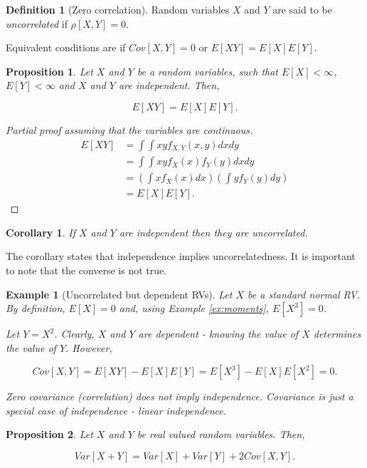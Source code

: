 \documentclass{book}
\theoremstyle{plain}%
\newtheorem{prototheorem}{Example}[section]
\newenvironment{cexample}
   {\colorlet{shadecolor}{gray!10}\begin{shaded}\begin{prototheorem}}
   {\end{prototheorem}\end{shaded}}
\newtheorem{corollary}{Corollary}[section]
\newtheorem{proposition}{Proposition}[section]
\theoremstyle{definition}
\newtheorem{definition}{Definition}[section]
\begin{document}
\begin{definition}[Zero correlation]
Random variables $X$ and $Y$ are said to be \emph{uncorrelated} if $\rho[X,Y] = 0$.

Equivalent conditions are if $Cov[X,Y] = 0$ or $E[XY] = E[X]E[Y]$.
\end{definition}



\begin{proposition}
Let $X$ and $Y$ be a random variables, such that $E[X] < \infty$, $E[Y] < \infty$ and $X$ and $Y$ are independent. Then,

$$E[XY] = E[X]E[Y].$$
\end{proposition}

\begin{proof}[Partial proof assuming that the variables are continuous] 
\begin{align*}
E[XY] &= \int\int x y f_{X,Y}(x,y) dx dy  \\
&= \int\int x y f_X(x)f_Y(y) dx dy \\
&= \left(\int x f_X(x) dx \right)  \left(\int y f_Y(y) dy\right) \\
&= E[X]E[Y].
\end{align*}
\end{proof}

\begin{corollary}
If $X$ and $Y$ are independent then they are uncorrelated.
\end{corollary}

The corollary states that independence implies uncorrelatedness. It is important to note that the converse is not true.

\begin{cexample}[Uncorrelated but dependent RVs]
Let $X$ be a standard normal RV. By definition, $E[X] = 0$ and, using Example \ref{ex:moments}, $E[X^3] = 0$.

Let $Y = X^2$. Clearly, $X$ and $Y$ are dependent - knowing the value of $X$ determines the value of $Y$. However,

$$Cov[X,Y] = E[XY] - E[X]E[Y] = E[X^3] - E[X]E[X^2] = 0.$$

Zero covariance (correlation) does not imply independence. Covariance is just a special case of independence - linear independence.
\end{cexample}



\begin{proposition}
Let $X$ and $Y$ be real valued random variables. Then,

$$Var[X+Y] = Var[X] + Var[Y] + 2Cov[X,Y].$$
\end{proposition}
\end{document}
